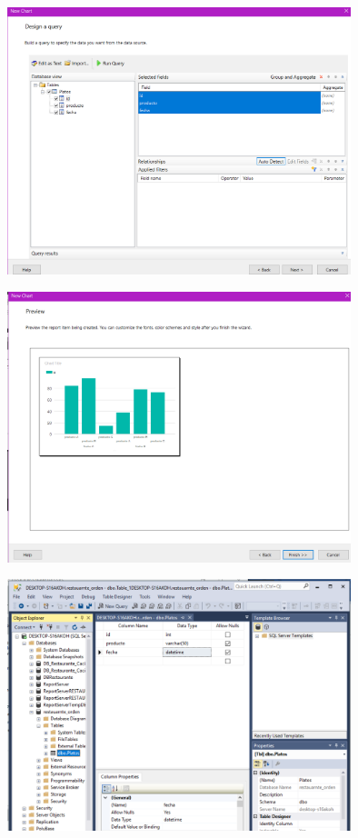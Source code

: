 	\begin{center}
	\includegraphics[width=10cm]{./Imagenes/ley8} 
	\end{center}
	
	\begin{center}
	\includegraphics[width=10cm]{./Imagenes/ley9} 
	\end{center}

	\begin{center}
	\includegraphics[width=10cm]{./Imagenes/ley10} 
	\end{center}
